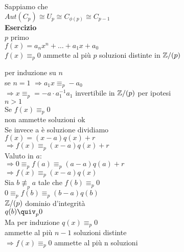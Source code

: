 \documentclass[12px]{article}
\begin{document}
   Sappiamo che\\
   $Aut(C_p)\cong U_p\cong C_{\phi(p)}\cong C_{p-1}$\\
   \textbf{Esercizio}\\
   $p$ primo\\
   $f(x) = a_nx^n + \ldots + a_1x + a_0$\\
   $f(x)\equiv_p 0$ ammette al più $p$ soluzioni distinte in  $\mathbb{Z} / (p)$\\
   \begin{dimo}
   	per induzione su $n$ \\
	se $n = 1$  $ \Rightarrow a_1x\equiv_p -a_0$ \\
	$ \Rightarrow x \equiv_p = -a\cdot a_1^{-1}$\hfill $a_1$ invertibile in $\mathbb{Z}/(p)$ per ipotesi \\
	$n > 1$ \\
	Se $f(x) \equiv_p 0$\\
	non ammette soluzioni ok \\
	Se invece a è soluzione dividiamo\\
	$f(x) = (x - a ) q(x) + r$\\
	 $ \Rightarrow f(x)\equiv_p (x-a)q(x) + r$ \\
	 Valuto in $a$:\\
	 $ \Rightarrow 0\equiv_p f(a) \equiv_p (a-a)q(a) + r$ \\
	 $ \Rightarrow f(x) \equiv_p (x - a)q(x)$\\
	 Sia  $b\not \equiv_p a$ tale che  $f(b)\equiv_p 0$\\
	  $0\equiv_p f(b) \equiv_p (b-a)q(b)$\\
	  $\mathbb{Z}/(p)$ dominio d'integrità\\
	  $q(b)\quiv_p 0$\\
	  Ma per induzione  $q(x)\equiv_p 0$\\
	  ammette al più  $n-1$ soluzioni distinte\\
	  $ \Rightarrow  f(x)\equiv_p 0$ ammette al più n soluzioni 

   \end{dimo}
\end{document}
